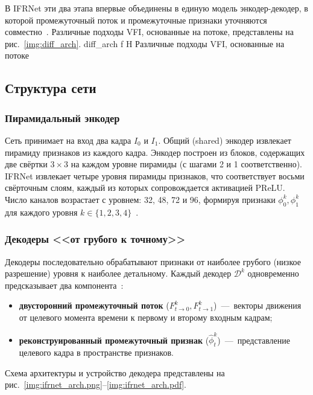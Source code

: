 В IFRNet эти два этапа впервые объединены в единую модель энкодер-декодер, в которой промежуточный поток и промежуточные признаки уточняются совместно~\cite{IFRNet2022}. Различные подходы VFI, основанные на потоке, представлены на рис.~\ref{img:diff_arch}.
	{diff_arch}
	{f}
	{H}
	{\textwidth}
	{Различные подходы VFI, основанные на потоке~\cite{IFRNet2022}}

\subsection*{Структура сети}

\subsubsection*{Пирамидальный энкодер}

Сеть принимает на вход два кадра $I_0$ и $I_1$. Общий (shared) энкодер извлекает пирамиду признаков из каждого кадра. Энкодер построен из блоков, содержащих две свёртки $3\times3$ на каждом уровне пирамиды (с шагами 2 и 1 соответственно). IFRNet извлекает четыре уровня пирамиды признаков, что соответствует восьми свёрточным слоям, каждый из которых сопровождается активацией PReLU. Число каналов возрастает с уровнем: 32, 48, 72 и 96, формируя признаки $\phi_0^k, \phi_1^k$ для каждого уровня $k \in \{1,2,3,4\}$~\cite{IFRNet2022}.

\subsubsection*{Декодеры <<от грубого к точному>>}

Декодеры последовательно обрабатывают признаки от наиболее грубого (низкое разрешение) уровня к наиболее детальному. Каждый декодер $\mathcal{D}^k$ одновременно предсказывает два компонента~\cite{IFRNet2022}:

\begin{itemize}
	\item \textbf{двусторонний промежуточный поток} ($F_{t \to 0}^k, F_{t \to 1}^k$)~---~векторы движения от целевого момента времени к первому и второму входным кадрам;
	\item \textbf{реконструированный промежуточный признак} ($\hat{\phi}_t^k$)~---~представление целевого кадра в пространстве признаков.
\end{itemize}

Схема архитектуры и устройство декодера представлены на рис.~\ref{img:ifrnet_arch.png}--\ref{img:ifrnet_arch.pdf}.

